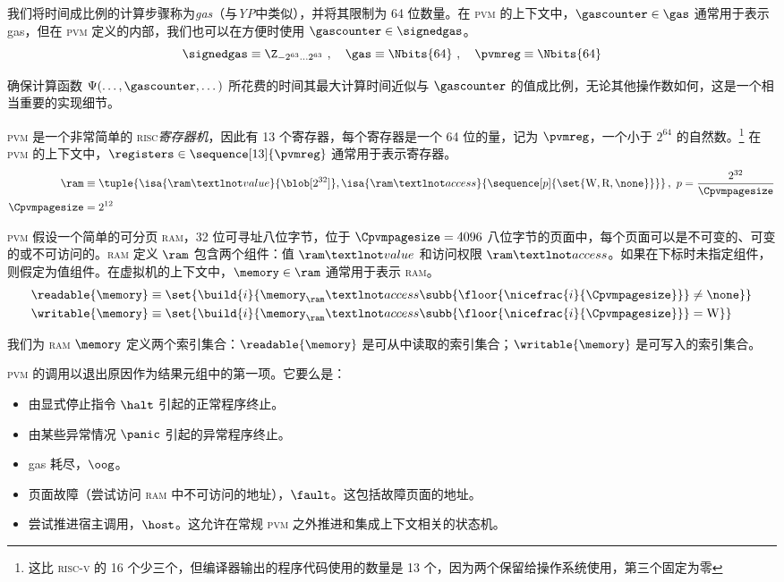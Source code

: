 我们将时间成比例的计算步骤称为\emph{gas}（与\emph{YP}中类似），并将其限制为 64 位数量。在 \textsc{pvm} 的上下文中，$\gascounter \in \gas$ 通常用于表示 gas，但在 \textsc{pvm} 定义的内部，我们也可以在方便时使用 $\gascounter \in \signedgas$。
\begin{equation}\label{eq:gasregentry}
  \signedgas \equiv \Z_{-2^{63}\dots2^{63}}\ ,\quad
  \gas \equiv \Nbits{64}\ ,\quad
  \pvmreg \equiv \Nbits{64}
\end{equation}

确保计算函数 $\Psi(\dots, \gascounter, \dots)$ 所花费的时间其最大计算时间近似与 $\gascounter$ 的值成比例，无论其他操作数如何，这是一个相当重要的实现细节。

\textsc{pvm} 是一个非常简单的 \textsc{risc}\emph{寄存器机}，因此有 13 个寄存器，每个寄存器是一个 64 位的量，记为 $\pvmreg$，一个小于 $2^{64}$ 的自然数。\footnote{这比 \textsc{risc-v} 的 16 个少三个，但编译器输出的程序代码使用的数量是 13 个，因为两个保留给操作系统使用，第三个固定为零} 在 \textsc{pvm} 的上下文中，$\registers \in \sequence[13]{\pvmreg}$ 通常用于表示寄存器。
\begin{align}\label{eq:pvmmemory}
  \ram &\equiv \tuple{
    \isa{\ram¬value}{\blob[2^{32}]},
    \isa{\ram¬access}{\sequence[p]{\set{\text{W}, \text{R}, \none}}}
  }\,,\ p = \frac{2^{32}}{\Cpvmpagesize}\\
  \Cpvmpagesize &= 2^{12}
\end{align}

\textsc{pvm} 假设一个简单的可分页 \textsc{ram}，32 位可寻址八位字节，位于 $\Cpvmpagesize = 4096$ 八位字节的页面中，每个页面可以是不可变的、可变的或不可访问的。\textsc{ram} 定义 $\ram$ 包含两个组件：值 $\ram¬value$ 和访问权限 $\ram¬access$。如果在下标时未指定组件，则假定为值组件。在虚拟机的上下文中，$\memory \in \ram$ 通常用于表示 \textsc{ram}。
\begin{align}
  \readable{\memory} &\equiv \set{\build{i}{\memory_\ram¬access\subb{\floor{\nicefrac{i}{\Cpvmpagesize}}} \ne \none}} \\
  \writable{\memory} &\equiv \set{\build{i}{\memory_\ram¬access\subb{\floor{\nicefrac{i}{\Cpvmpagesize}}} = \text{W} }}
\end{align}

我们为 \textsc{ram} $\memory$ 定义两个索引集合：$\readable{\memory}$ 是可从中读取的索引集合；$\writable{\memory}$ 是可写入的索引集合。

\textsc{pvm} 的调用以退出原因作为结果元组中的第一项。它要么是：
\begin{itemize}
  \item 由显式停止指令 $\halt$ 引起的正常程序终止。
  \item 由某些异常情况 $\panic$ 引起的异常程序终止。
  \item gas 耗尽，$\oog$。
  \item 页面故障（尝试访问 \textsc{ram} 中不可访问的地址），$\fault$。这包括故障页面的地址。
  \item 尝试推进宿主调用，$\host$。这允许在常规 \textsc{pvm} 之外推进和集成上下文相关的状态机。
\end{itemize}

